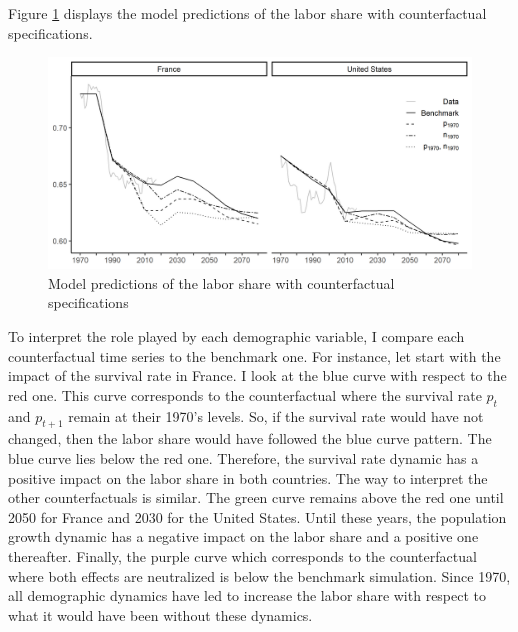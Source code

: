 Figure \ref{fig:counter_PGSR_1970} displays the model predictions of the labor share with counterfactual specifications.
\begin{figure}[tb]
	\centering
	\includegraphics[width=1\linewidth]{../result/decomposition/counter_PGSR.png}
	\caption{Model predictions of the labor share with counterfactual specifications}
	\label{fig:counter_PGSR_1970}
\end{figure}
To interpret the role played by each demographic variable, I compare each counterfactual time series to the benchmark one. For instance, let start with the impact of the survival rate in France. I look at the blue curve with respect to the red one. This curve corresponds to the counterfactual where the survival rate $p_t$ and $p_{t+1}$ remain at their 1970's levels. So, if the survival rate would have not changed, then the labor share would have followed the blue curve pattern. 
The blue curve lies below the red one. Therefore, the survival rate dynamic has a positive impact on the labor share in both countries.
The way to interpret the other counterfactuals is similar.
The green curve remains above the red one until 2050 for France and 2030 for the United States. Until these years, the population growth dynamic has a negative impact on the labor share and a positive one thereafter.
Finally, the purple curve which corresponds to the counterfactual where both effects are neutralized is below the benchmark simulation. Since 1970, all demographic dynamics have led to increase the labor share with respect to what it would have been without these dynamics.
